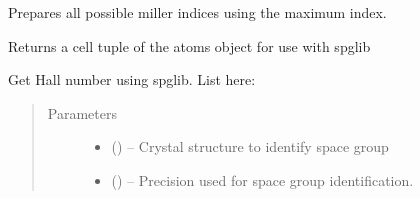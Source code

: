 \documentclass[letterpaper,10pt,english,openany,oneside]{sphinxmanual}
\begin{document}
\begin{fulllineitems}
\begin{fulllineitems}
\label{\detokenize{index:ogre.utils.UniquePlanes.prep_idx}}
Prepares all possible miller indices using the maximum index.

\end{fulllineitems}


\begin{fulllineitems}
\label{\detokenize{index:ogre.utils.UniquePlanes.get_cell}}
Returns a cell tuple of the atoms object for use with spglib

\end{fulllineitems}


\begin{fulllineitems}
\label{\detokenize{index:ogre.utils.UniquePlanes.get_hall_number}}
Get Hall number using spglib.
List here: 
\begin{quote}\begin{description}
\item[{Parameters}] \leavevmode\begin{itemize}
\item {} 
 () -- Crystal structure to identify space group

\item {} 
 () -- Precision used for space group identification.

\end{itemize}

\end{description}\end{quote}

\end{fulllineitems}



\end{fulllineitems}
\end{document}

